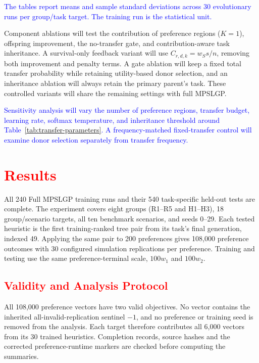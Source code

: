 \documentclass[10pt,journal]{IEEEtran}
\newcommand{\revision}[1]{\textcolor{blue}{#1}}
\newcommand{\ablationrevision}[1]{\textcolor{red}{#1}}
\begin{document}
\revision{The tables report means and sample standard deviations across 30 evolutionary runs per group/task target. The training run is the statistical unit.}

Component ablations will test the contribution of preference regions ($K=1$), offspring improvement, the no-transfer gate, and contribution-aware task inheritance. A survival-only feedback variant will use $C_{r,d,k}=w_Ss/n$, removing both improvement and penalty terms. A gate ablation will keep a fixed total transfer probability while retaining utility-based donor selection, and an inheritance ablation will always retain the primary parent's task. These controlled variants will share the remaining settings with full MPSLGP.

\revision{Sensitivity analysis will vary the number of preference regions, transfer budget, learning rate, softmax temperature, and inheritance threshold around Table~\ref{tab:transfer-parameters}. A frequency-matched fixed-transfer control will examine donor selection separately from transfer frequency.}

\begingroup
\color{red}
\section{\ablationrevision{Results}}
\label{sec:results}
All 240 Full MPSLGP training runs and their 540 task-specific held-out tests are complete. The experiment covers eight groups (R1--R5 and H1--H3), 18 group/scenario targets, all ten benchmark scenarios, and seeds 0--29. Each tested heuristic is the first training-ranked tree pair from its task's final generation, indexed 49. Applying the same pair to 200 preferences gives 108,000 preference outcomes with 30 configured simulation replications per preference. Training and testing use the same preference-terminal scale, $100w_1$ and $100w_2$.

\subsection{\ablationrevision{Validity and Analysis Protocol}}
All 108,000 preference vectors have two valid objectives. No vector contains the inherited all-invalid-replication sentinel $-1$, and no preference or training seed is removed from the analysis. Each target therefore contributes all 6,000 vectors from its 30 trained heuristics. Completion records, source hashes and the corrected preference-runtime markers are checked before computing the summaries.
\end{document}
